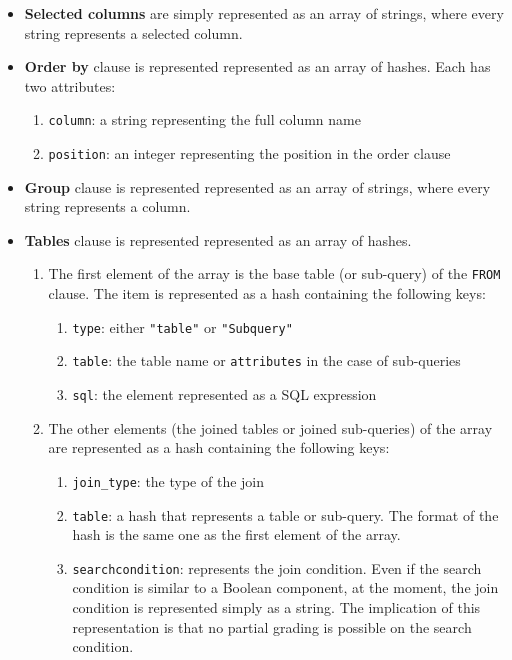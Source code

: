 \begin{itemize}
    \item \textbf{Selected columns} are simply represented as an array of strings, where every string represents a selected column.
    \item \textbf{Order by} clause is represented represented as an array of hashes. Each has two attributes:
    \begin{enumerate}
        \item \texttt{column}: a string representing the full column name
        \item \texttt{position}: an integer representing the position in the order clause
    \end{enumerate}
    \item \textbf{Group} clause is represented represented as an array of strings, where every string represents a column.
    \item \textbf{Tables} clause is represented represented as an array of hashes.
    \begin{enumerate}
        \item The first element of the array is the base table (or sub-query) of the \texttt{FROM} clause. The item is represented as a hash containing the following keys:
        \begin{enumerate}
            \item \texttt{type}: either \texttt{"table"} or \texttt{"Subquery"}
            \item \texttt{table}: the table name or \texttt{attributes} in the case of sub-queries
            \item \texttt{sql}: the element represented as a SQL expression
        \end{enumerate}
        \item The other elements (the joined tables or joined sub-queries) of the array are represented as a hash containing the following keys:
        \begin{enumerate}
            \item \texttt{join_type}: the type of the join
            \item \texttt{table}: a hash that represents a table or sub-query. The format of the hash is the same one as the first element of the array.
            \item \texttt{searchcondition}: represents the join condition. Even if the search condition is similar to a Boolean component, at the moment, the join condition is represented simply as a string. The implication of this representation is that no partial grading is possible on the search condition.

\end{enumerate}
\end{enumerate}
\end{itemize}
